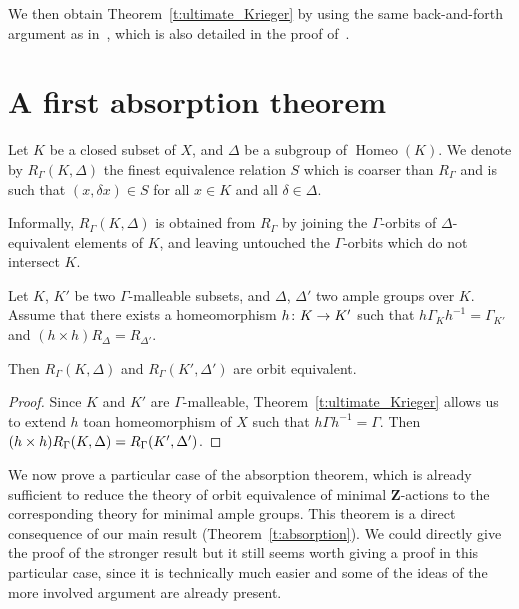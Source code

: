 \documentclass[AHL,Unicode]{cedram}
\DeclareMathOperator{\Homeo}{Homeo}
\newcommand{\Z}{\mathbf{Z}}
\renewcommand*{\to}{\mathchoice{\longrightarrow}{\rightarrow}{\rightarrow}{\rightarrow}}
\begin{document}
We then obtain Theorem~\ref{t:ultimate_Krieger} by using the same back-and-forth argument as in~\cite[Theorem~3.5]{Krieger1979}, which is also detailed in the proof of~\cite[Theorem~3.11]{Melleray2023}.

\section{A first absorption theorem}
\begin{defi}
Let $K$ be a closed subset of $X$, and $\Delta$ be a subgroup of $\Homeo(K)$. We denote by $R_\Gamma(K,\Delta)$ the finest equivalence relation $S$ which is coarser than $R_\Gamma$ and is such that $(x,\delta x) \in S$ for all $x \in K$ and all $\delta \in \Delta$.
\end{defi}

Informally, $R_\Gamma(K,\Delta)$ is obtained from $R_\Gamma$ by joining the $\Gamma$-orbits of $\Delta$-equivalent elements of $K$, and leaving untouched the $\Gamma$-orbits which do not intersect $K$.


\begin{lemm}\label{l:any_copy_will_do}
Let $K$, $K'$ be two $\Gamma$-malleable subsets, and $\Delta$, $\Delta'$ two ample groups over $K$. Assume that there exists a homeomorphism $h \colon K \to K'$ such that $h\Gamma_K h^{-1}=\Gamma_{K'}$ and $(h \times h) R_\Delta=R_{\Delta'}$.

Then $R_\Gamma(K,\Delta)$ and $R_\Gamma(K',\Delta')$ are orbit equivalent.
\end{lemm}

\begin{proof}
Since $K$ and $K'$ are $\Gamma$-malleable, Theorem~\ref{t:ultimate_Krieger} allows us to extend $h$ to\linebreak an homeomorphism of $X$ such that $h \Gamma h^{-1} = \Gamma$. Then $(h \times h)R_\Gamma(K,\Delta)=\linebreak R_\Gamma(K',\Delta')$.
\end{proof}


We now prove a particular case of the absorption theorem, which is already sufficient to reduce the theory of orbit equivalence of minimal $\Z$-actions to the corresponding theory for minimal ample groups. This theorem is a direct consequence of our main result (Theorem~\ref{t:absorption}). We could directly give the proof of the stronger result but it still seems worth giving a proof in this particular case, since it is technically much easier and some of the ideas of the more involved argument are already present.
\end{document}
